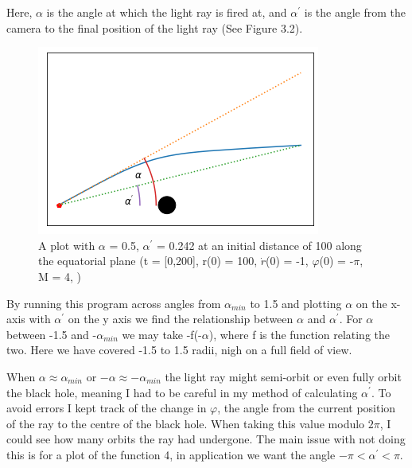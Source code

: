\documentclass[oneside,openright,frontopenright]{dmathesis}
\begin{document}
	Here, $\alpha$ is the angle at which the light ray is fired at, and $\alpha^{'}$ is the angle from the camera to the final position of the light ray (See Figure 3.2).
\begin{figure}
	\centering
	\begin{minipage}[b]{0.6\textwidth}
		\includegraphics[width=\textwidth]{img/alpha_alpha-prime}
		\caption{A plot with $\alpha$ = 0.5, $\alpha^{'}$ = 0.242 at an initial distance of 100 along the equatorial plane (t = [0,200], r(0) = 100, $\dot{r}$(0) = -1, $\varphi$(0) = -$\pi$, M = 4, )}
	\end{minipage}
\end{figure}

	By running this program across angles from $\alpha_{min}$ to 1.5 and plotting $\alpha$ on the x-axis with $\alpha^{'}$ on the y axis we find the relationship between $\alpha$ and $\alpha^{'}$. For $\alpha$ between -1.5 and -$\alpha_{min}$ we may take -f(-$\alpha$), where f is the function relating the two. Here we have covered -1.5 to 1.5 radii, nigh on a full field of view.

	When $\alpha \approx \alpha_{min}$ or $-\alpha \approx -\alpha_{min}$ the light ray might semi-orbit or even fully orbit the black hole, meaning I had to be careful in my method  of calculating $\alpha^{'}$. To avoid errors I kept track of the change in $\varphi$, the angle from the current position of the ray to the centre of the black hole. When taking this value modulo $2\pi$, I could see how many orbits the ray had undergone. The main issue with not doing this is for a plot of the function 4, in application we want the angle $-\pi<\alpha^{'}<\pi$.
\end{document}
